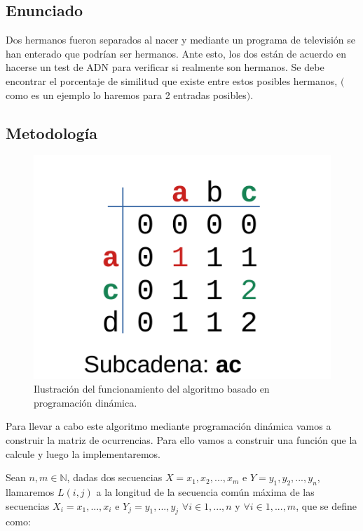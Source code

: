 \subsection{Enunciado}
Dos hermanos fueron separados al nacer y mediante un programa de televisión se han
enterado que podrían ser hermanos. Ante esto, los dos están de acuerdo en hacerse un test de
ADN para verificar si realmente son hermanos. Se debe encontrar el porcentaje de similitud que existe 
entre estos posibles hermanos, $($como es un ejemplo lo haremos para 2 entradas posibles$)$.

\subsection{Metodología} \label{sec:metodologia}

\begin{figure}[h]
  \centering
  \includegraphics[scale=1.0]{img/dibujito.pdf}
  \caption{Ilustración del funcionamiento del algoritmo basado en programación dinámica.}
\end{figure}

Para llevar a cabo este algoritmo mediante programación dinámica vamos a construir la matriz de 
ocurrencias. Para ello vamos a construir una función que la calcule y luego la implementaremos.

Sean $n,m \in \mathbb{N}$, dadas dos secuencias $X = { x_1,x_2,...,x_m}$ e $Y = { y_1,y_2,...,y_n}$, llamaremos $L(i,j)$ a la 
longitud de la secuencia común máxima de las secuencias $X_i = {x_1,...,x_i}$ e $Y_j = {y_1,...,y_j}$ $\forall i \in {1,...,n} $ y $\forall i \in {1,...,m}$, 
que se define como:  

